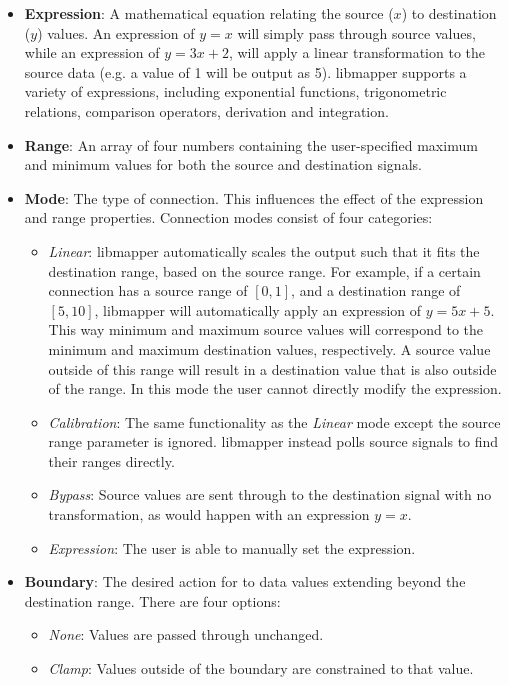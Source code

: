 \begin{itemize}
	\item\textbf{Expression}: A mathematical equation relating the source ($x$) to destination ($y$) values. An expression of $y = x$ will simply pass through source values, while an expression of $y = 3x + 2$, will apply a linear transformation to the source data (e.g. a value of 1 will be output as 5). libmapper supports a variety of expressions, including exponential functions, trigonometric relations, comparison operators, derivation and integration. 
	\item\textbf{Range}: An array of four numbers containing the user-specified maximum and minimum values for both the source and destination signals.
	\item\textbf{Mode}: The type of connection. This influences the effect of the expression and range properties. Connection modes consist of four categories:
	\begin{itemize}
		\item \emph{Linear}: libmapper automatically scales the output such that it fits the destination range, based on the source range. For example, if a certain connection has a source range of $[0, 1]$, and a destination range of $[5, 10]$, libmapper will automatically apply an expression of $y = 5x + 5$. This way minimum and maximum source values will correspond to the minimum and maximum destination values, respectively. A source value outside of this range will result in a destination value that is also outside of the range. In this mode the user cannot directly modify the expression. 
		\item \emph{Calibration}: The same functionality as the \emph{Linear} mode except the source range parameter is ignored. libmapper instead polls source signals to find their ranges directly.
		\item \emph{Bypass}: Source values are sent through to the destination signal with no transformation, as would happen with an expression $y = x$.
		\item \emph{Expression}: The user is able to manually set the expression.
	\end{itemize}
	\item\textbf{Boundary}: The desired action for to data values extending beyond the destination range. There are four options:
	\begin{itemize}
		\item\emph{None}: Values are passed through unchanged.
		\item\emph{Clamp}: Values outside of the boundary are constrained to that value.

\end{itemize}
\end{itemize}
